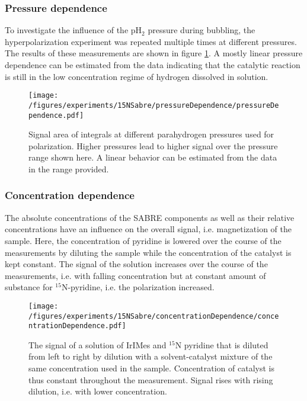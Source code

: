     \subsubsection{Pressure dependence}
    To investigate the influence of the pH$_2$ pressure during bubbling, the hyperpolarization experiment was repeated multiple times at different pressures. The results of these measurements are shown in figure \ref{fig:results:15N:pressureDependence}. A mostly linear pressure dependence can be estimated from the data indicating that the catalytic reaction is still in the low concentration regime of hydrogen dissolved in solution.
        \begin{figure}
            \texttt{[image: /figures/experiments/15NSabre/pressureDependence/pressureDependence.pdf]}
            \caption[Pressure dependence]{Signal area of integrals at different parahydrogen pressures used for polarization. Higher pressures lead to higher signal over the pressure range shown here. A linear behavior can be estimated from the data in the range provided.}
            \label{fig:results:15N:pressureDependence}
        \end{figure}
    \subsubsection{Concentration dependence}
        The absolute concentrations of the SABRE components as well as their relative concentrations have an influence on the overall signal, i.e. magnetization of the sample. Here, the concentration of pyridine is lowered over the course of the measurements by diluting the sample while the concentration of the catalyst is kept constant. The signal of the solution increases over the course of the measurements, i.e. with falling concentration but at constant amount of substance for $^{15}$N-pyridine, i.e. the polarization increased.
        \begin{figure}
            \texttt{[image: /figures/experiments/15NSabre/concentrationDependence/concentrationDependence.pdf]}
            \caption[Concentration dependence]{The signal of a solution of IrIMes and $^{15}$N pyridine that is diluted from left to right by dilution with a solvent-catalyst mixture of the same concentration used in the sample. Concentration of catalyst is thus constant throughout the measurement. Signal rises with rising dilution, i.e. with lower concentration.}
            \label{fig:results:15N:concentrationDependence}
        \end{figure}
